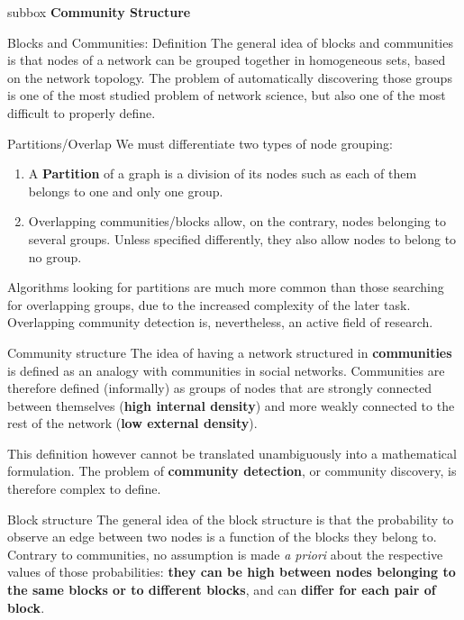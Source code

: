 \begin{subbox}{subbox}{}
    \centering
    \Large{\textbf{Community Structure}}
\end{subbox}


\begin{textbox}{Blocks and Communities: Definition}
    The general idea of blocks and communities is that nodes of a network can be grouped together in homogeneous sets, based on the network topology. The problem of automatically discovering those groups is one of the most studied problem of network science, but also one of the most difficult to properly define.
\end{textbox}


\begin{textbox}{Partitions/Overlap}
    We must differentiate two types of node grouping:
    \begin{enumerate}
        \item A \textbf{Partition} of a graph is a division of its nodes such as each of them belongs to one and only one group.
        \item Overlapping communities/blocks allow, on the contrary, nodes belonging to several groups. Unless specified differently, they also allow nodes to belong to no group.
    \end{enumerate}
    Algorithms looking for partitions are much more common than those searching for overlapping groups, due to the increased complexity of the later task. Overlapping community detection is, nevertheless, an active field of research.
\end{textbox}


\begin{textbox}{Community structure}
    The idea of having a network structured in \textbf{communities} is defined as an analogy with communities in social networks. Communities are therefore defined (informally) as groups of nodes that are strongly connected between themselves (\textbf{high internal density}) and more weakly connected to the rest of the network (\textbf{low external density}).

    This definition however cannot be translated unambiguously into a mathematical formulation. The problem of \textbf{community detection}, or community discovery, is therefore complex to define.
\end{textbox}


\begin{textbox}{Block structure}
    The general idea of the block structure is that the probability to observe an edge between two nodes is a function of the blocks they belong to. Contrary to communities, no assumption is made \textit{a priori} about the respective values of those probabilities: \textbf{they can be high between nodes belonging to the same blocks or to different blocks}, and can \textbf{differ for each pair of block}.

\end{textbox}



